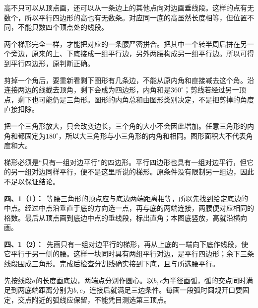 \documentclass[multi=snippet,border=0pt]{standalone}
\newenvironment{snippet}[3]{\begin{minipage}{#1bp}\color{answerred}\fontsize{#2}{#3}\selectfont\raggedright}{\end{minipage}}
\begin{document}
\begin{snippet}{505}{11.5}{14}高不只可以从顶点画，还可以从一条边上的其他点向对边画垂线段。这样的点有无数个，所以平行四边形的高也有无数条。对应同一底的高虽然长度相等，但位置不同，不能只数四个顶点处的线段。\end{snippet}
\begin{snippet}{505}{11.5}{14}两个梯形完全一样，才能把对应的一条腰严密拼合。把其中一个转半周后拼在另一个旁边，原来的上、下底接成一组平行边，另外两腰构成另一组平行边。所以可得到平行四边形，原判断正确。\end{snippet}
\begin{snippet}{505}{11.5}{14}剪掉一个角后，要重新看剩下图形有几条边，不能从原内角和直接减去这个角。沿连接两边的线截去顶角，剩下会成为四边形，内角和是\(360^\circ\)；剪线若经过另一顶点，剩下也可能仍是三角形。图形的内角总和由图形类别决定，不是把剪掉的角度直接扣除。\end{snippet}
\begin{snippet}{505}{11.5}{14}把一个三角形放大，只会改变边长，三个角的大小不会因此增加。任意三角形的内角和都固定为\(180^\circ\)，所以大三角形与小三角形的内角和相同。图形面积大不代表角度和大。\end{snippet}
\begin{snippet}{505}{11.5}{14}梯形必须是“只有一组对边平行”的四边形。平行四边形也具有一组对边平行，但它的另一组对边同样平行，便不是这里所说的梯形。原条件没有限制另一组边，因此不足以保证结论。\end{snippet}
\begin{snippet}{505}{11.5}{14}\textbf{四、1（1）：}\ 等腰三角形的顶点应与底边两端距离相等，所以先找到给定底边的中点。经过中点沿垂直于底的方向选一点，再与底的两端连接，两腰便对应相同的格数。最后从顶点画到底边中点的垂线段，标出直角；本图底竖放，高就沿横向画。\end{snippet}
\begin{snippet}{505}{11.5}{14}\textbf{四、1（2）：}\ 先画只有一组对边平行的梯形，再从上底的一端向下底作线段，使它平行于另一侧的腰。这样一块同时具有两组平行对边，是平行四边形；余下三条线段围成三角形。完成后检查分割线确实接到下底，且与所选腰平行。\end{snippet}
\begin{snippet}{505}{11.5}{14}先按线段\(a\)的长度画底边，两端点分别作圆心。以\(b,c\)为半径画弧，弧的交点同时满足到两底端距离分别为\(b,c\)，连接后就满足三边条件。每画一段弧时圆规开口要固定，交点附近的弧线应保留，不能凭目测选第三顶点。\end{snippet}
\end{document}

